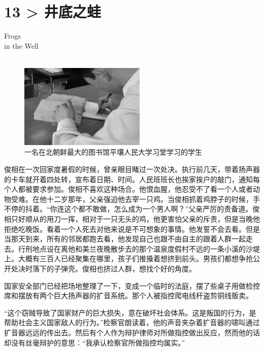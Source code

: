 \chapter*{13 > 井底之蛙}
\vspace{15mm}
\begin{flushright}
	\textcolor{PinYinColor}{\EN \huge{Frogs\\
			in the Well\\
			\ \\}}
\end{flushright}

\begin{figure}[!htbp]
	\centering
	\includegraphics[width=6cm]{./Chapters/Images/13.jpg}
	\caption*{一名在北朝鲜最大的图书馆平壤人民大学习堂学习的学生}
\end{figure}

俊相在一次回家度暑假的时候，曾亲眼目睹过一次处决。执行前几天，带着扬声器的卡车就开着四处转，宣布着日期、时间。人民班班长也挨家挨户的敲门，通知每个人都被要求参加。俊相不喜欢这种场合。他恨血腥，他忍受不了看一个人或者动物受难。在他十二岁那年，父亲强迫他去宰一只鸡。当俊相抓着鸡脖子的时候，手不停的抖着。“你连这个都不敢做，怎么成为一个男人啊？”父亲严厉的责备道。俊相只好顺从的用刀一挥，相对于一只无头的鸡，他更害怕父亲的斥责，但是当晚他拒绝吃晚饭。看着一个人死去对他来说是不可想象的事情。他发誓不会去看。但是当那天到来，所有的邻居都跑去看，他发现自己也跟不由自主的跟着人群一起走去。行刑地点设在离他和美兰夜晚散步去的那个温泉度假村不远的一条小溪的沙堤上。大概有三百人已经聚集在哪里，孩子们推搡着想挤到前头。男孩们都想争抢公开处决时落下的子弹壳。俊相也挤过人群，想找个好的角度。

国家安全部门已经把场地整理了一下，变成一个临时的法庭，摆了些桌子用做检控席和摆放有两个巨大扬声器的扩音系统。那个人被指控爬电线杆盗剪铜线贩卖。

“这个窃贼导致了国家财产的巨大损失，意在破坏社会体系。这是叛国的行为，是帮助社会主义国家敌人的行为。”检察官朗读着，他的声音夹杂着扩音器的啸叫通过扩音器远远的传出去。然后有个人作为辩护律师对所做指控做出反应，然而他的话却没有丝毫辩护的意思：“我承认检察官所做指控均属实。”

